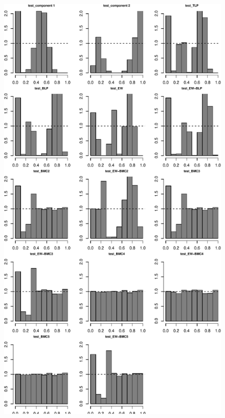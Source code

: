 \documentclass[
]{article}
\begin{document}
\begin{figure}[h]

{\centering \includegraphics{applied_blp_sim_files/figure-latex/unnamed-chunk-20-1} 

}

\end{figure}

\clearpage
\end{document}
